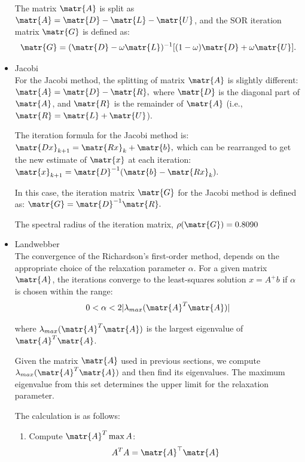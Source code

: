 \begin{itemize}
    The matrix $ \matr{A} $ is split as $ \matr{A} = \matr{D} - \matr{L} - \matr{U} $, and the SOR iteration matrix $ \matr{G}$ is defined as:
    $$ \matr{G}  = (\matr{D} - \omega \matr{L})^{-1}[(1-\omega)\matr{D} + \omega \matr{U}]. $$

  \item Jacobi \\
  
    For the Jacobi method, the splitting of matrix $ \matr{A} $ is slightly different:
    $ \matr{A} = \matr{D} - \matr{R}, $
    where $ \matr{D} $ is the diagonal part of $ \matr{A} $, and $ \matr{R} $ is the remainder of $ \matr{A} $ (i.e., $ \matr{R} = \matr{L} + \matr{U} $).

    The iteration formula for the Jacobi method is:
    $ \matr{Dx}_{k+1} = \matr{Rx}_k + \matr{b}, $
    which can be rearranged to get the new estimate of $ \matr{x} $ at each iteration:
    $ \matr{x}_{k+1} = \matr{D}^{-1}(\matr{b} - \matr{Rx}_k). $

    In this case, the iteration matrix $ \matr{G} $ for the Jacobi method is defined as:
    $ \matr{G} = \matr{D}^{-1}\matr{R}. $

    The spectral radius of the iteration matrix, $ \rho(\matr{G}) = 0.8090$

  \item Landwebber \\
  
  The convergence of the Richardson's first-order method, depends on the appropriate choice of the relaxation parameter \( \alpha \). 
  For a given matrix $\matr{A}$, the iterations converge to the least-squares solution \( x = A^+b \) if \( \alpha \) is chosen within the range:
  \begin{equation*}
    0 < \alpha < 2|\lambda_{max}(\matr{A}^T\matr{A})| 
  \end{equation*}

  where  $\lambda_{max}(\matr{A}^T\matr{A})$ is the largest eigenvalue of $ \matr{A}^T\matr{A} $.

  Given the matrix $\matr{A}$ used in previous sections, we compute $\lambda_{max}(\matr{A}^T\matr{A})$ and then find its eigenvalues. 
  The maximum eigenvalue from this set determines the upper limit for the relaxation parameter. 
  
  The calculation is as follows:
  \begin{enumerate}
      \item Compute $ \matr{A}^T\max{A} $:
      \begin{equation*}
          A^TA = \matr{A}^\top \matr{A}
      \end{equation*}
      

\end{enumerate}
\end{itemize}
